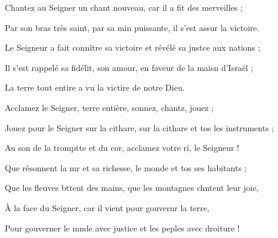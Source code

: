 \item Chantez au Seigner un chant nouveau,\psstar{} car il a fit des merveilles ; 
\item Par son bras très saint, par sa min puissante,\psstar{} il s’est assur la victoire.
\item Le Seigneur a fait connître sa victoire\psstar{} et révélé sa justce aux nations ;
\item Il s’est rappelé sa fidélit, son amour,\psstar{} en faveur de la maisn d’Israël ; 
\item La terre tout entire a vu\psstar{} la victire de notre Dieu.
\item Acclamez le Seigner, terre entière,\psstar{} sonnez, chantz, jouez ;
\item Jouez pour le Seigner sur la cithare,\psstar{} sur la cithare et tos les instruments ;
\item Au son de la tromptte et du cor,\psstar{} acclamez votre ri, le Seigneur !
\item Que résonnent la mr et sa richesse,\psstar{} le monde et tos ses habitants ;
\item Que les fleuves bttent des mains,\psstar{} que les montagnes chntent leur joie,
\item À la face du Seigner, car il vient\psstar{} pour gouvernr la terre,
\item Pour gouverner le mnde avec justice\psstar{} et les peples avec droiture !